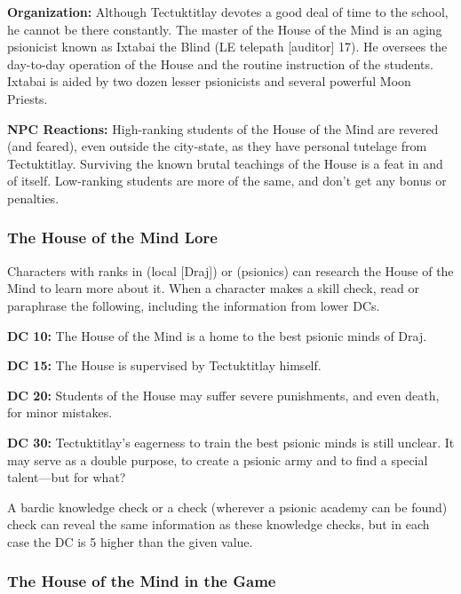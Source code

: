 \textbf{Organization:} Although Tectuktitlay devotes a good deal of time to the school, he cannot be there constantly. The master of the House of the Mind is an aging psionicist known as Ixtabai the Blind (LE telepath [auditor] 17). He oversees the day-to-day operation of the House and the routine instruction of the students. Ixtabai is aided by two dozen lesser psionicists and several powerful Moon Priests.

\textbf{NPC Reactions:} High-ranking students of the House of the Mind are revered (and feared), even outside the city-state, as they have personal tutelage from Tectuktitlay. Surviving the known brutal teachings of the House is a feat in and of itself. Low-ranking students are more of the same, and don't get any bonus or penalties.

\subsubsection{The House of the Mind Lore}
Characters with ranks in  (local [Draj]) or  (psionics) can research the House of the Mind to learn more about it. When a character makes a skill check, read or paraphrase the following, including the information from lower DCs.

\textbf{DC 10:} The House of the Mind is a home to the best psionic minds of Draj.

\textbf{DC 15:} The House is supervised by Tectuktitlay himself.

\textbf{DC 20:} Students of the House may suffer severe punishments, and even death, for minor mistakes.

\textbf{DC 30:} Tectuktitlay's eagerness to train the best psionic minds is still unclear. It may serve as a double purpose, to create a psionic army and to find a special talent---but for what?

A bardic knowledge check or a  check (wherever a psionic academy can be found) check can reveal the same information as these knowledge checks, but in each case the DC is 5 higher than the given value.

\subsubsection{The House of the Mind in the Game}
